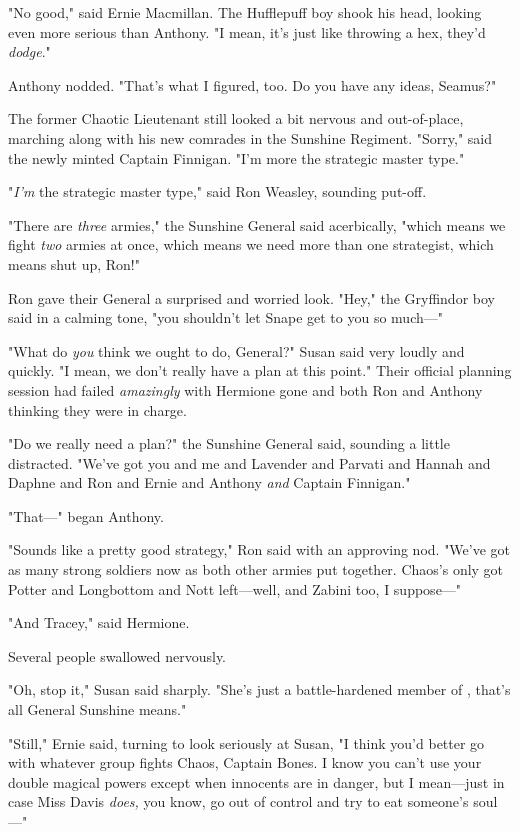 "No good," said Ernie Macmillan. The Hufflepuff boy shook his head, looking 
even more serious than Anthony. "I mean, it's just like throwing a hex, they'd 
\emph{dodge}."

Anthony nodded. "That's what I figured, too. Do you have any ideas, Seamus?"

The former Chaotic Lieutenant still looked a bit nervous and out-of-place, 
marching along with his new comrades in the Sunshine Regiment. "Sorry," said 
the newly minted Captain Finnigan. "I'm more the strategic master type."

"\emph{I'm} the strategic master type," said Ron Weasley, sounding put-off.

"There are \emph{three} armies," the Sunshine General said acerbically, "which 
means we fight \emph{two} armies at once, which means we need more than one 
strategist, which means shut up, Ron!"

Ron gave their General a surprised and worried look. "Hey," the Gryffindor boy 
said in a calming tone, "you shouldn't let Snape get to you so much---"

"What do \emph{you} think we ought to do, General?" Susan said very loudly and 
quickly. "I mean, we don't really have a plan at this point." Their official 
planning session had failed \emph{amazingly} with Hermione gone and both Ron 
and Anthony thinking they were in charge.

"Do we really need a plan?" the Sunshine General said, sounding a little 
distracted. "We've got you and me and Lavender and Parvati and Hannah and 
Daphne and Ron and Ernie and Anthony \emph{and} Captain Finnigan."

"That---" began Anthony.

"Sounds like a pretty good strategy," Ron said with an approving nod. "We've 
got as many strong soldiers now as both other armies put together. Chaos's only 
got Potter and Longbottom and Nott left---well, and Zabini too, I suppose---"

"And Tracey," said Hermione.

Several people swallowed nervously.

"Oh, stop it," Susan said sharply. "She's just a battle-hardened member of 
\SPHEW, that's all General Sunshine means."

"Still," Ernie said, turning to look seriously at Susan, "I think you'd better 
go with whatever group fights Chaos, Captain Bones. I know you can't use your 
double magical powers except when innocents are in danger, but I mean---just in 
case Miss Davis \emph{does,} you know, go out of control and try to eat 
someone's soul---"

